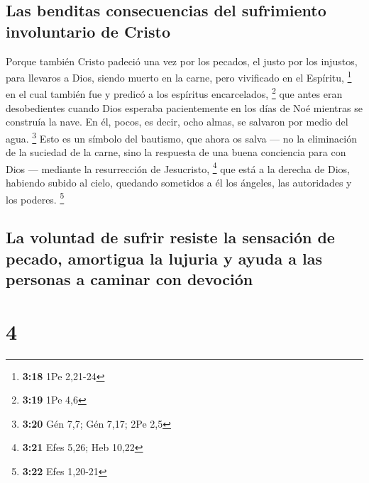 \hypertarget{las-benditas-consecuencias-del-sufrimiento-involuntario-de-cristo}{%
\subsection{Las benditas consecuencias del sufrimiento involuntario de
Cristo}\label{las-benditas-consecuencias-del-sufrimiento-involuntario-de-cristo}}

 Porque también Cristo padeció una vez por los pecados,
el justo por los injustos, para llevaros a Dios, siendo muerto en la
carne, pero vivificado en el Espíritu, \footnote{\textbf{3:18} 1Pe
  2,21-24}  en el cual también fue y predicó a los
espíritus encarcelados, \footnote{\textbf{3:19} 1Pe 4,6} 
que antes eran desobedientes cuando Dios esperaba pacientemente en los
días de Noé mientras se construía la nave. En él, pocos, es decir, ocho
almas, se salvaron por medio del agua. \footnote{\textbf{3:20} Gén 7,7;
  Gén 7,17; 2Pe 2,5}  Esto es un símbolo del bautismo,
que ahora os salva --- no la eliminación de la suciedad de la carne,
sino la respuesta de una buena conciencia para con Dios --- mediante la
resurrección de Jesucristo, \footnote{\textbf{3:21} Efes 5,26; Heb 10,22}
 que está a la derecha de Dios, habiendo subido al cielo,
quedando sometidos a él los ángeles, las autoridades y los poderes.
\footnote{\textbf{3:22} Efes 1,20-21}

\hypertarget{la-voluntad-de-sufrir-resiste-la-sensaciuxf3n-de-pecado-amortigua-la-lujuria-y-ayuda-a-las-personas-a-caminar-con-devociuxf3n}{%
\subsection{La voluntad de sufrir resiste la sensación de pecado,
amortigua la lujuria y ayuda a las personas a caminar con
devoción}\label{la-voluntad-de-sufrir-resiste-la-sensaciuxf3n-de-pecado-amortigua-la-lujuria-y-ayuda-a-las-personas-a-caminar-con-devociuxf3n}}

\hypertarget{section-3}{%
\section{4}\label{section-3}}

